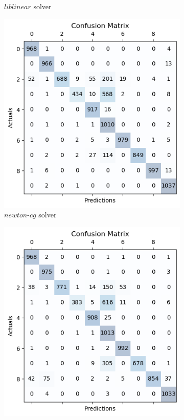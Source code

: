 \documentclass{article}
\begin{document}
\begin{titlepage}
\begin{figure}[htbp]
\begin{subfigure}[t]{0.3\linewidth}
      \caption{$liblinear$ solver}
      \label{fig:sample6b}
    \end{subfigure}
    \hfill
    \begin{subfigure}[t]{0.3\linewidth}
      \includegraphics[width=\linewidth]{LRMC(newton-cg).png}
      \caption{$newton$-$cg$ solver}
      \label{fig:sample6c}
    \end{subfigure}
    \hfill
    \begin{subfigure}[t]{0.3\linewidth}
      \includegraphics[width=\linewidth]{LRMC(newton-cholesky).png}

\end{subfigure}
\end{figure}
\end{titlepage}
\end{document}

